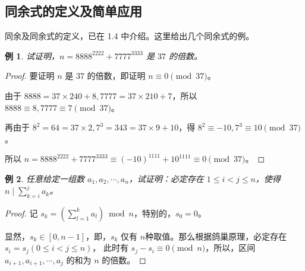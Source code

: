 \documentclass[a4paper]{article}
\newtheorem{exam}{例}[subsection]
\begin{document}
\subsection{同余式的定义及简单应用}

同余及同余式的定义，已在 1.4 中介绍。这里给出几个同余式的例。

\begin{exam}
    试证明，$n=8888^{2222}+7777^{3333}$ 是 $37$ 的倍数。
\end{exam}

\begin{proof}
    要证明 $n$ 是 $37$ 的倍数，即证明 $n\equiv 0 \pmod {37}$。

    由于 $8888=37\times 240+8,7777=37\times 210+7$，所以 $8888\equiv 8,7777\equiv 7\pmod {37}$。

    再由于 $8^2=64=37\times 2,7^3=343=37\times 9+10$，得 $8^2\equiv -10,7^3\equiv 10\pmod {37}$。
    
    所以 $n=8888^{2222}+7777^{3333}\equiv(-10)^{1111}+10^{1111}\equiv 0\pmod {37}$。
\end{proof}

\begin{exam}
    任意给定一组数 $a_1,a_2,\cdots,a_n$，试证明：必定存在 $1\le i<j\le n$，使得 $n\mid \sum\limits_{k=i}^j a_k$。
\end{exam}

\begin{proof}
    记 $s_k=(\sum\limits_{l=1}^k a_l)\bmod n$，特别的，$s_0=0$。
    
    显然，$s_k\in[0,n-1]$，即，$s_k$ 仅有 $n$种取值。那么根据鸽巢原理，必定存在 $s_i=s_j(0\le i<j\le n)$，
    此时有 $s_j-s_i\equiv 0\pmod n$，所以，区间 $a_{i+1},a_{i+1},\cdots,a_j$ 的和为 $n$ 的倍数。
\end{proof}
\end{document}
